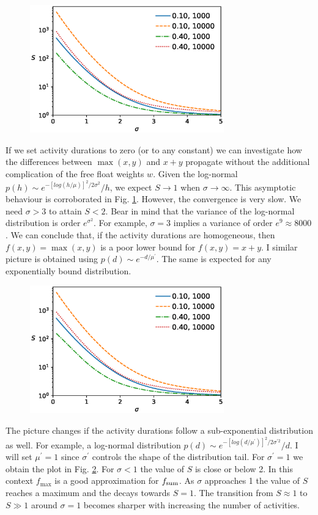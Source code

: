 \documentclass[reprint,aps,prl,amsmath,amssymb,superscriptaddress,showpacs]{revtex4-1}
\begin{document}
\begin{figure}[t]
\includegraphics[width=3.3in]{maxsum.scheduling.dupsplit.arc_distribution_zero.eps}
\caption{}
\label{fig1}
\end{figure}

If we set activity durations to zero (or to any constant) we can investigate how the differences between $\max(x,y)$ and $x+y$ propagate without the additional complication of the free float weights $w$. Given the log-normal $p(h)\sim e^{-[log(h/\mu)]^2/2\sigma^2}/h$, we expect $S\rightarrow1$ when $\sigma\rightarrow\infty$. This asymptotic behaviour is corroborated in Fig. \ref{fig1}. However, the convergence is very slow. We need $\sigma>3$ to attain $S<2$. Bear in mind that the variance of the log-normal distribution is order $e^{\sigma^2}$. For example, $\sigma=3$ implies a variance of order $e^9\approx 8000$. We can conclude that, if the activity durations are homogeneous, then $f(x,y)=\max(x,y)$ is a poor lower bound for $f(x,y)=x+y$. I similar picture is obtained using $p(d)\sim e^{-d/\mu^\prime}$. The same is expected for any exponentially bound distribution.

\begin{figure}[t]
\includegraphics[width=3.3in]{maxsum.scheduling.dupsplit.arc_distribution_lognormal.arc_sigma_1.eps}
\caption{}
\label{fig2}
\end{figure}

The picture changes if the activity durations follow a sub-exponential distribution as well. For example, a log-normal distribution $p(d)\sim e^{-[log(d/\mu^\prime)]^2/2\sigma^{\prime 2}}/d$. I will set $\mu^\prime=1$ since $\sigma^\prime$ controls the shape of the distribution tail. For $\sigma^\prime=1$ we obtain the plot in Fig. \ref{fig2}. For $\sigma<1$ the value of $S$ is close or below 2. In this context $f_{\max}$ is a good approximation for $f_{\rm sum}$. As $\sigma$ approaches 1 the value of $S$ reaches a maximum and the decays towards $S=1$. The transition from $S\approx 1$ to $S\gg1$ around $\sigma=1$ becomes sharper with increasing the number of activities. 
\end{document}
